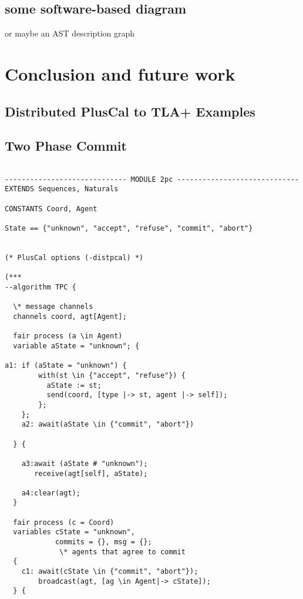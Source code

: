 \documentclass{thesul}
\begin{document}
\section{some software-based diagram}

or maybe an AST description graph

\chapter{Conclusion and future work}

\begin{appendices}
\chapter{Distributed PlusCal to TLA+ Examples}
\section{Two Phase Commit}
\label{appendix:examples}

\begin{lstlisting}[caption = TLA+ translation for Sub-Processes, frame = tlrb, firstnumber = 1]

----------------------------- MODULE 2pc -----------------------------
EXTENDS Sequences, Naturals

CONSTANTS Coord, Agent

State == {"unknown", "accept", "refuse", "commit", "abort"}

    
(* PlusCal options (-distpcal) *)

(***
--algorithm TPC {
 
  \* message channels
  channels coord, agt[Agent];
     
  fair process (a \in Agent)
  variable aState = "unknown"; {

a1: if (aState = "unknown") {
        with(st \in {"accept", "refuse"}) {
          aState := st;
          send(coord, [type |-> st, agent |-> self]);
        };
    };
    a2: await(aState \in {"commit", "abort"})
    
  } {
    
    a3:await (aState # "unknown");
       receive(agt[self], aState); 
       
    a4:clear(agt);
  }

  fair process (c = Coord) 
  variables cState = "unknown",
            commits = {}, msg = {};
             \* agents that agree to commit
  {
    c1: await(cState \in {"commit", "abort"});    
        broadcast(agt, [ag \in Agent|-> cState]);
  } {
        

\end{lstlisting}
\end{appendices}
\end{document}
